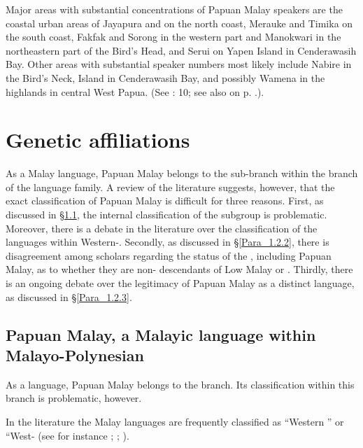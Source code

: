 {Major areas with }substantial concentrations of Papuan Malay speakers are the coastal urban areas of Jayapura and  on the north coast, Merauke and Timika on the south coast, Fakfak and Sorong in the western part and Manokwari in the northeastern part of the Bird’s Head, and Serui on Yapen Island in Cenderawasih Bay. Other areas with substantial speaker numbers most likely include Nabire in the Bird’s Neck,  Island in Cenderawasih Bay, and possibly Wamena in the highlands in central West Papua. (See {\citealt{Scott.2008}: 10}; see also  on p. \pageref{Figure_0.2}.).

\section{Genetic affiliations}\label{Para_1.2}
As a Malay language, Papuan Malay belongs to the  sub-branch within the  branch of the  language family. A review of the literature suggests, however, that the exact classification of Papuan Malay is difficult for three reasons. First, as discussed in §\ref{Para_1.2.1}, the internal classification of the  subgroup is problematic. Moreover, there is a debate in the literature over the classification of the  languages within Western-. Secondly, as discussed in §\ref{Para_1.2.2}, there is disagreement among scholars regarding the status of the , including Papuan Malay, as to whether they are non- descendants of Low Malay or . Thirdly, there is an ongoing debate over the legitimacy of Papuan Malay as a distinct language, as discussed in §\ref{Para_1.2.3}.

\subsection[Papuan Malay, a {Malayic} language]{Papuan Malay, a {Malayic} language within Malayo-Polynesian}\label{Para_1.2.1}
As a  language, Papuan Malay belongs to the  branch. Its classification within this branch is problematic, however.


In the literature the Malay languages are frequently classified as  ``Western '' or  ``West- (see for instance \citealt[227]{Adelaar.2001}; \citealt[677]{Nothofer.2009}; \citealt[791]{Tadmor.2009b}).


